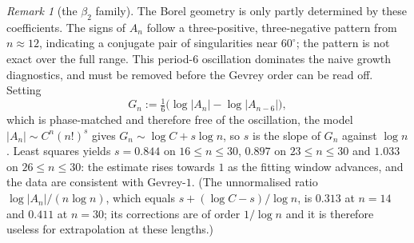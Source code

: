 \documentclass[11pt]{article}
\theoremstyle{plain}
\theoremstyle{definition}
\theoremstyle{remark}
\newtheorem{remark}[theorem]{Remark}
\begin{document}
\begin{remark}[the $\beta_2$ family]
The Borel geometry is only partly determined by these coefficients. The signs of $A_n$ follow a
three-positive, three-negative pattern from $n\approx12$, indicating a conjugate pair of
singularities near $60^\circ$; the pattern is not exact over the full range. This period-$6$
oscillation dominates the naive growth diagnostics, and must be removed before the Gevrey order can
be read off. Setting
\[
   G_n:=\tfrac16\bigl(\log|A_n|-\log|A_{n-6}|\bigr),
\]
which is phase-matched and therefore free of the oscillation, the model $|A_n|\sim C^n(n!)^s$ gives
$G_n\sim\log C+s\log n$, so $s$ is the slope of $G_n$ against $\log n$. Least squares yields
$s=0.844$ on $16\le n\le30$, $0.897$ on $23\le n\le30$ and $1.033$ on $26\le n\le30$: the estimate
rises towards $1$ as the fitting window advances, and the data are consistent with Gevrey-$1$.
(The unnormalised ratio $\log|A_n|/(n\log n)$, which equals $s+(\log C-s)/\log n$, is $0.313$ at
$n=14$ and $0.411$ at $n=30$; its corrections are of order $1/\log n$ and it is therefore useless
for extrapolation at these lengths.)


\end{remark}
\end{document}
